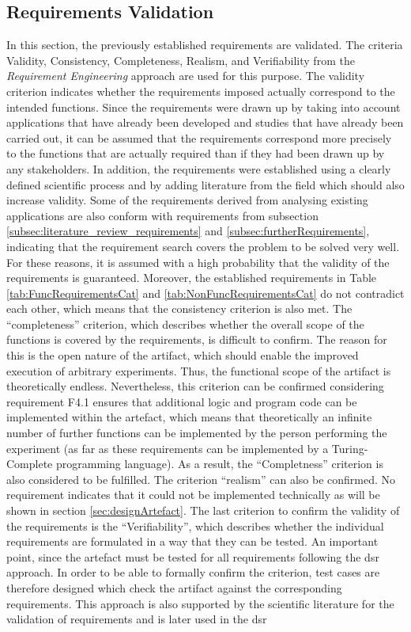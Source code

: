 \newpage


\subsection{Requirements Validation}\label{subsec:requirement_validation}

In this section, the previously established requirements are validated. The criteria Validity, Consistency, Completeness, Realism, and Verifiability from the \textit{Requirement Engineering} approach are used for this purpose. The validity criterion indicates whether the requirements imposed actually correspond to the intended functions. Since the requirements were drawn up by taking into account applications that have already been developed and studies that have already been carried out, it can be assumed that the requirements correspond more precisely to the functions that are actually required than if they had been drawn up by any stakeholders. In addition, the requirements were established using a clearly defined scientific process and by adding literature from the field which should also increase validity. Some of the requirements derived from analysing existing applications are also conform with requirements from subsection \ref{subsec:literature_review_requirements} and \ref{subsec:furtherRequirements}, indicating that the requirement search covers the problem to be solved very well. For these reasons, it is assumed with a high probability that the validity of the requirements is guaranteed. Moreover, the established requirements in Table \ref{tab:FuncRequirementsCat} and \ref{tab:NonFuncRequirementsCat} do not contradict each other, which means that the consistency criterion is also met. The \enquote{completeness} criterion, which describes whether the overall scope of the functions is covered by the requirements, is difficult to confirm. The reason for this is the open nature of the artifact, which should enable the improved execution of arbitrary experiments. Thus, the functional scope of the artifact is theoretically endless. Nevertheless, this criterion can be confirmed considering requirement F4.1 ensures that additional logic and program code can be implemented within the artefact, which means that theoretically an infinite number of further functions can be implemented by the person performing the experiment (as far as these requirements can be implemented by a Turing-Complete programming language). As a result, the \enquote{Completness} criterion is also considered to be fulfilled. The criterion \enquote{realism} can also be confirmed. No requirement indicates that it could not be implemented technically as will be shown in section \ref{sec:designArtefact}. The last criterion to confirm the validity of the requirements is the \enquote{Verifiability}, which describes whether the individual requirements are formulated in a way that they can be tested. An important point, since the artefact must be tested for all requirements following the \ac{dsr} approach. In order to be able to formally confirm the criterion, test cases are therefore designed which check the artifact against the corresponding requirements. This approach is also supported by the scientific literature for the validation of requirements and is later used in the \ac{dsr} 